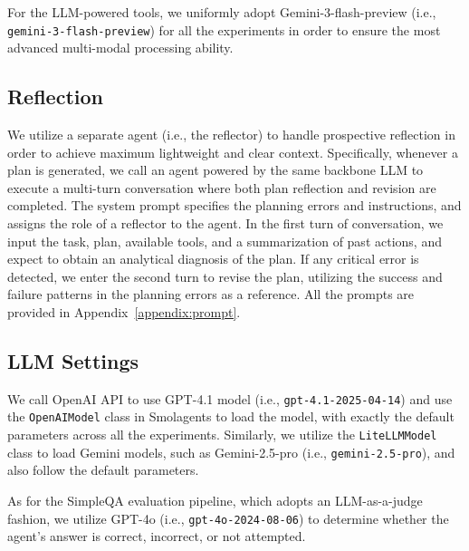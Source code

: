 For the LLM-powered tools, we uniformly adopt Gemini-3-flash-preview (i.e., \texttt{gemini-3-flash-preview}) for all the experiments in order to ensure the most advanced multi-modal processing ability.

\subsection{Reflection}

We utilize a separate agent (i.e., the reflector) to handle prospective reflection in order to achieve maximum lightweight and clear context. Specifically, whenever a plan is generated, we call an agent powered by the same backbone LLM to execute a multi-turn conversation where both plan reflection and revision are completed. The system prompt specifies the planning errors and instructions, and assigns the role of a reflector to the agent. In the first turn of conversation, we input the task, plan, available tools, and a summarization of past actions, and expect to obtain an analytical diagnosis of the plan. If any critical error is detected, we enter the second turn to revise the plan, utilizing the success and failure patterns in the planning errors as a reference. All the prompts are provided in Appendix~\ref{appendix:prompt}.

\subsection{LLM Settings}
We call OpenAI API to use GPT-4.1 model (i.e., \texttt{gpt-4.1-2025-04-14}) and use the \texttt {OpenAIModel} class in Smolagents to load the model, with exactly the default parameters across all the experiments. Similarly, we utilize the \texttt{LiteLLMModel} class to load Gemini models, such as Gemini-2.5-pro (i.e., \texttt{gemini-2.5-pro}), and also follow the default parameters.

As for the SimpleQA evaluation pipeline, which adopts an LLM-as-a-judge fashion, we utilize GPT-4o (i.e., \texttt{gpt-4o-2024-08-06}) to determine whether the agent's answer is correct, incorrect, or not attempted.